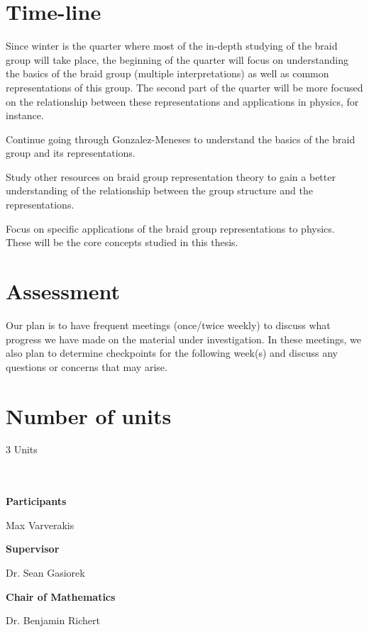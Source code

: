 \documentclass[oneside]{memoir}
\begin{document}
\section{Time-line}

Since winter is the quarter where most of the in-depth studying of the braid group will take place, the beginning of the quarter will focus on understanding the basics of the braid group (multiple interpretations) as well as common representations of this group. The second part of the quarter will be more focused on the relationship between these representations and applications in physics, for instance.
\begin{description}[topsep=0pt,itemsep=0ex]
    \item[\parbox{5em}{Weeks 1-3}] Continue going through Gonzalez-Meneses to understand the basics of the braid group and its representations.
    \item[\parbox{5em}{Weeks 4-6}] Study other resources on braid group representation theory to gain a better understanding of the relationship between the group structure and the representations.
    \item[\parbox{5em}{Weeks 7-10}] Focus on specific applications of the braid group representations to physics. These will be the core concepts studied in this thesis.
\end{description}




\section{Assessment}

Our plan is to have frequent meetings (once/twice weekly) to discuss what progress we have made on the material under investigation.  In these meetings, we also plan to determine checkpoints for the following week(s) and discuss any questions or concerns that may arise.

\section{Number of units}

3 Units

\vspace{1in}
\dotfill\\\\
\textbf{Participants}

\parbox{11em}{Max Varverakis} %

\textbf{Supervisor}

\parbox{11em}{Dr. Sean Gasiorek} %

\textbf{Chair of Mathematics}

\parbox{11em}{Dr. Benjamin Richert} %
\end{document}
